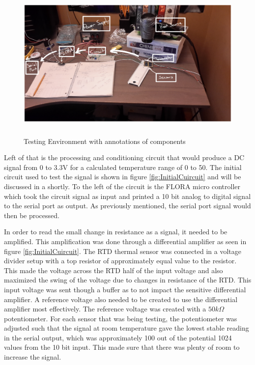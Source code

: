 \documentclass[12pt,a4paper]{report}
\begin{document}
\begin{figure}[h!]
    \centering
    \includegraphics[height = 3in]{Images/TestingSetup.png}
    \caption{Testing Environment with annotations of components}
    \label{fig:Testing Setup}
\end{figure}

Left of that is the processing and conditioning circuit that would produce a DC signal from 0 to 3.3V for a calculated temperature range of 0 to 50\textcelsius{}. The initial circuit used to test the signal is shown in figure \ref{fig:InitialCuircuit} and will be discussed in a shortly. To the left of the circuit is the FLORA micro controller which took the circuit signal as input and printed a 10 bit analog to digital signal to the serial port as output. As previously mentioned, the serial port signal would then be processed.\par

In order to read the small change in resistance as a signal, it needed to be amplified. This amplification was done through a differential amplifier as seen in figure \ref{fig:InitialCuircuit}. The RTD thermal sensor was connected in a voltage divider setup with a top resistor of approximately equal value to the resistor. This made the voltage across the RTD half of the input voltage and also maximized the swing of the voltage due to changes in resistance of the RTD. This input voltage was sent though a buffer as to not impact the sensitive differential amplifier. A reference voltage also needed to be created to use the differential amplifier most effectively. The reference voltage was created with a $50k\Omega$ potentiometer. For each sensor that was being testing, the potentiometer was adjusted such that the signal at room temperature gave the lowest stable reading in the serial output, which was approximately 100 out of the potential 1024 values from the 10 bit input. This made sure that there was plenty of room to increase the signal.
\end{document}

